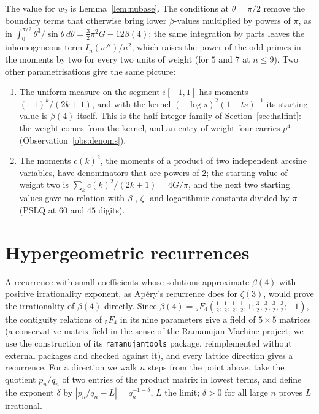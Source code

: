 \documentclass[11pt]{article}
\theoremstyle{definition}
\begin{document}
The value for $w_2$ is Lemma~\ref{lem:nubase}. The conditions at $\theta=\pi/2$ remove the boundary terms that otherwise bring lower $\beta$-values multiplied by powers of $\pi$, as in $\int_0^{\pi/2}\theta^3/\sin\theta\,d\theta=\frac32\pi^2G-12\beta(4)$; the same integration by parts leaves the inhomogeneous term $I_n(w'')/n^2$, which raises the power of the odd primes in the moments by two for every two units of weight (for $5$ and $7$ at $n\le9$). Two other parametrisations give the same picture:
\begin{enumerate}
\item The uniform measure on the segment $i[-1,1]$ has moments $(-1)^k/(2k+1)$, and with the kernel $(-\log s)^2(1-ts)^{-1}$ its starting value is $\beta(4)$ itself. This is the half-integer family of Section~\ref{sec:halfint}: the weight comes from the kernel, and an entry of weight four carries $p^4$ (Observation~\ref{obs:denoms}).
\item The moments $c(k)^2$, the moments of a product of two independent arcsine variables, have denominators that are powers of $2$; the starting value of weight two is $\sum_kc(k)^2/(2k+1)=4G/\pi$, and the next two starting values gave no relation with $\beta$-, $\zeta$- and logarithmic constants divided by $\pi$ (PSLQ at $60$ and $45$ digits).
\end{enumerate}

\section{Hypergeometric recurrences}\label{sec:cmf}

A recurrence with small coefficients whose solutions approximate $\beta(4)$ with positive irrationality exponent, as Ap\'ery's recurrence does for $\zeta(3)$, would prove the irrationality of $\beta(4)$ directly. Since $\beta(4)={}_5F_4(\frac12,\frac12,\frac12,\frac12,1;\frac32,\frac32,\frac32,\frac32;-1)$, the contiguity relations of ${}_5F_4$ in its nine parameters give a field of $5\times5$ matrices (a conservative matrix field in the sense of the Ramanujan Machine project; we use the construction of its \texttt{ramanujantools} package, reimplemented without external packages and checked against it), and every lattice direction gives a recurrence. For a direction we walk $n$ steps from the point above, take the quotient $p_n/q_n$ of two entries of the product matrix in lowest terms, and define the exponent $\delta$ by $|p_n/q_n-L|=q_n^{-1-\delta}$, $L$ the limit; $\delta>0$ for all large $n$ proves $L$ irrational.
\end{document}
